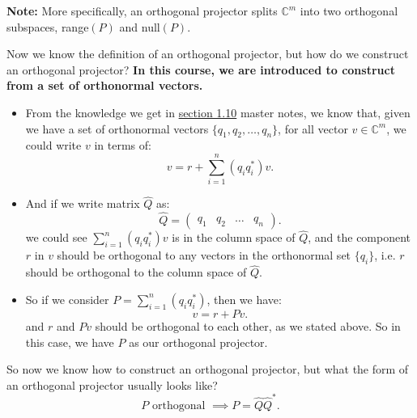 \noindent \textbf{Note:} More specifically, an orthogonal projector splits $\mathbb{C}^{m}$ into two orthogonal subspaces, range$(P)$ and null$(P)$.

\bigskip
\noindent Now we know the definition of an orthogonal projector, but how do we construct an orthogonal projector? \textbf{In this course, we are introduced to construct from a set of orthonormal vectors.} 
\begin{itemize}
\item From the knowledge we get in \href{https://comp-lin-alg.github.io/L1_preliminaries.html#constructing-orthogonal-projectors-from-sets-of-orthonormal-vectors}{section 1.10} master notes, we know that, given we have a set of orthonormal vectors $\{q_1, q_2, \ldots, q_n\}$, for all vector $v \in \mathbb{C}^{m}$, we could write $v$ in terms of:
  \[
    v = r + \sum_{i = 1}^{n} (q_iq_i^{*})v
  .\] 
\item And if we write matrix $\hat{Q}$ as:
  \[
    \hat{Q} = \begin{pmatrix} q_1 & q_2 & \ldots & q_n \end{pmatrix} 
  .\]
  we could see $\sum_{i=1}^{n} (q_iq_i^{*})v$ is in the column space of $\hat{Q}$, and the component $r$ in $v$ should be orthogonal to any vectors in the orthonormal set $ \{q_i\} $, i.e. $r$ should be orthogonal to the column space of $\hat{Q}$.
  \item So if we consider $P = \sum_{i=1}^{n} (q_iq_i^{*})$, then we have:
    \[
    v = r + Pv
    .\] 
    and $r$ and $Pv$ should be orthogonal to each other, as we stated above. So in this case, we have $P$ as our orthogonal projector.
\end{itemize}
So now we know how to construct an orthogonal projector, but what the form of an orthogonal projector usually looks like?
\[
P \text{ orthogonal } \implies P = \hat{Q}\hat{Q}^{*}
.\] 
